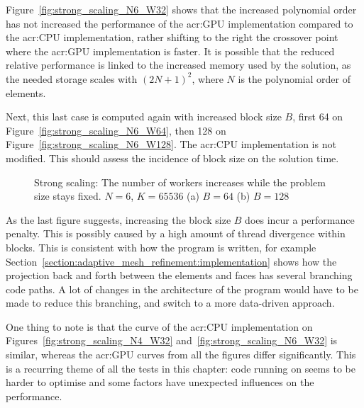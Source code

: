 Figure~\ref{fig:strong_scaling_N6_W32} shows that the increased polynomial order has not increased
the performance of the \acrshort{acr:GPU} implementation compared to the \acrshort{acr:CPU}
implementation, rather shifting to the right the crossover point where the \acrshort{acr:GPU}
implementation is faster. It is possible that the reduced relative performance is linked to the
increased memory used by the solution, as the needed storage scales with \({\left( 2 N + 1
\right)}^2\), where \(N\) is the polynomial order of elements.

Next, this last case is computed again with increased block size \(B\), first 64 on
Figure~\ref{fig:strong_scaling_N6_W64}, then 128 on Figure~\ref{fig:strong_scaling_N6_W128}. The
\acrshort{acr:CPU} implementation is not modified. This should assess the incidence of block size on
the solution time.

\begin{figure}[H]
    \centering
    \subfloat[\(B = 64\)]
    {\label{fig:strong_scaling_N6_W64}}
    \hfill
    \subfloat[\(B = 128\)]
    {\label{fig:strong_scaling_N6_W128}}
    \caption{Strong scaling: The number of workers increases while the problem size stays fixed. \(N
        = 6\), \(K = 65536\) (a) \(B = 64\) (b) \(B = 128\)}\label{fig:strong_scaling_N6_W64-128}
\end{figure}

As the last figure suggests, increasing the block size \(B\) does incur a performance penalty. This
is possibly caused by a high amount of thread divergence within blocks. This is consistent with how
the program is written, for example Section~\ref{section:adaptive_mesh_refinement:implementation}
shows how the projection back and forth between the elements and faces has several branching code
paths. A lot of changes in the architecture of the program would have to be made to reduce this
branching, and switch to a more data-driven approach.

One thing to note is that the curve of the \acrshort{acr:CPU} implementation on
Figures~\ref{fig:strong_scaling_N4_W32} and~\ref{fig:strong_scaling_N6_W32} is similar, whereas the
\acrshort{acr:GPU} curves from all the figures differ significantly. This is a recurring theme of
all the tests in this chapter: code running on  seems to be harder to optimise
and some factors have unexpected influences on the performance.

